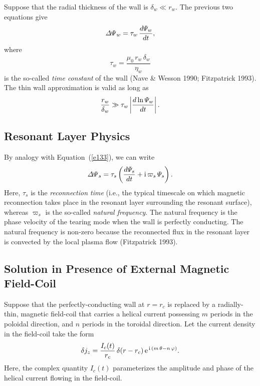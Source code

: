 \documentclass[notitlepage,12pt]{article}
\begin{document}
Suppose that the radial thickness of the wall is $\delta_w\ll r_w$. The previous two equations give
\begin{equation}\label{e133}
{\mit\Delta\Psi}_w = \tau_w\,\frac{d{\mit\Psi}_w}{dt},
\end{equation}
where
\begin{equation}
\tau_w = \frac{\mu_0\,r_w\,\delta_w}{\eta_w}
\end{equation}
is the so-called {\em time constant}\/ of the wall (Nave \& Wesson 1990; Fitzpatrick 1993). The thin wall approximation is
valid as long as
\begin{equation}
\frac{r_w}{\delta_w}\gg \tau_w\left|\frac{d\ln{\mit\Psi}_w}{dt}\right|.
\end{equation}

\subsection{Resonant Layer Physics}\label{sres}
By analogy with Equation~(\ref{e133}), we can write
\begin{equation}\label{e134}
{\mit\Delta\Psi}_s = \tau_s\left(\frac{d{\mit\Psi}_s}{dt} + {\rm i}\,\varpi_s\,{\mit\Psi}_s\right).
\end{equation}
Here, $\tau_s$ is the {\em reconnection time}\/ (i.e., the typical timescale on which magnetic reconnection takes place in the
resonant layer surrounding the resonant surface), whereas $\varpi_s$ is the so-called {\em natural frequency}. 
The natural frequency is the phase velocity of the tearing mode when the wall is perfectly conducting. The
natural frequency is non-zero because the reconnected flux in the resonant layer is convected by the local plasma
flow (Fitzpatrick 1993). 

\subsection{Solution in Presence of External Magnetic Field-Coil}
Suppose that the perfectly-conducting wall at $r=r_c$ is replaced by a radially-thin, magnetic field-coil that carries a
helical current possessing $m$ periods in the poloidal direction, and $n$ periods in the toroidal direction. Let the current density in the field-coil
take the form
\begin{equation}\label{e135}
\delta j_z = \frac{I_c(t)}{r_c}\,\delta(r-r_c)\,{\rm e}^{\,{\rm i}\,(m\,\theta-n\,\varphi)}.
\end{equation}
Here, the complex quantity $I_c(t)$ parameterizes the amplitude and phase of the helical current flowing in the field-coil. 
\end{document}
